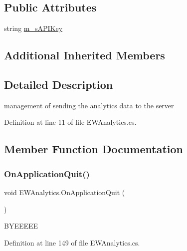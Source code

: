 \subsection*{Public Attributes}
\begin{DoxyCompactItemize}
\item 
string \mbox{\hyperlink{class_e_w_analytics_ab39bd84ab0c4149e5cf91e3fbf01080f}{m\+\_\+s\+A\+P\+I\+Key}}
\end{DoxyCompactItemize}
\subsection*{Additional Inherited Members}


\subsection{Detailed Description}
management of sending the analytics data to the server 



Definition at line 11 of file E\+W\+Analytics.\+cs.



\subsection{Member Function Documentation}
\mbox{\label{class_e_w_analytics_a782a29c4da578b817de9038de174c156}} 
\subsubsection{\texorpdfstring{On\+Application\+Quit()}{OnApplicationQuit()}}
{\footnotesize\ttfamily void E\+W\+Analytics.\+On\+Application\+Quit (\begin{DoxyParamCaption}{ }\end{DoxyParamCaption})}



B\+Y\+E\+E\+E\+EE 



Definition at line 149 of file E\+W\+Analytics.\+cs.

\mbox{\label{class_e_w_analytics_a7b8c3295e831cd066ab9b3de90d02a45}} 
